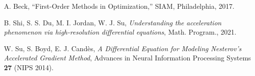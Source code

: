 \documentclass[12pt]{article}
\begin{document}
\begin{thebibliography}{99}
   A. Beck, ``First-Order Methods in Optimization,'' SIAM, Philadelphia, 2017.

   B. Shi, S.  S. Du,  M. I. Jordan,  W. J. Su,
  {\it Understanding the acceleration phenomenon via high-resolution differential equations},
  Math. Program., 2021.

   W.  Su,  S. Boyd,  E. J. Cand\`es, {\it A Differential Equation for Modeling Nesterov's Accelerated Gradient Method},
  Advances in Neural Information Processing Systems \textbf{27} (NIPS 2014).
\end{thebibliography}
\end{document}
